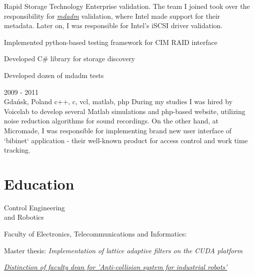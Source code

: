 \documentclass[a4paper,11pt]{cv4tw}%
\begin{document}
      {Rapid Storage Technology Enterprise validation. The team I joined took over the responsibility
        for \href{https://en.wikipedia.org/wiki/Mdadm}{\emph{mdadm}} validation, where Intel
        made support for their metadata. Later on, I was responsible for Intel's iSCSI driver validation.
        \begin{missions}
        \item Implemented python-based testing framework for CIM RAID interface
        \item Developed C\# library for storage discovery
        \item Developed dozen of mdadm tests
        \end{missions}
      }
      {2009 - 2011\\Gdańsk, Poland}
      {c++, c, vcl, matlab, php}
      {During my studies I was hired by Voicelab to develop several Matlab simulations and php-based
        website, utilizing noise reduction algorithms for sound recordings. On the other hand, at Micromade,
        I was responsible for implementing brand new user interface of `bibinet` application - their well-known
        product for access control and work time tracking.
      }
\section{Education}
      {Control Engineering\\and Robotics}
      {Faculty of Electronics, Telecommunications and Informatics:
        \begin{missions}
          \item Master thesis: \textit{Implementation of lattice adaptive filters on the CUDA platform}
          \item \href{https://projektgrupowy.eti.pg.gda.pl/editions/2/projects/496/posters/138}{\emph{Distinction of faculty dean for \itshape 'Anti-collision system for industrial robots'}}
        \end{missions}
      }

\end{document}
